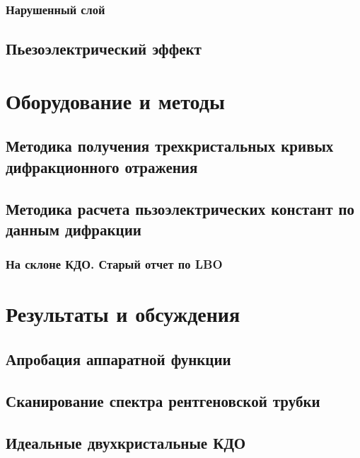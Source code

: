 \documentclass[pdftex,a4paper,14pt,english,russian]{extarticle}
\numberwithin{equation}{subsection}
\begin{document}
    \subsubsection{Нарушенный слой}
      
  \subsection{Пьезоэлектрический эффект}
    

\newpage
\section{Оборудование и методы}
  
  
  

  
  
  \subsection{Методика получения трехкристальных кривых дифракционного отражения}
    
    
  \subsection{Методика расчета пьзоэлектрических констант по данным дифракции}
    
  \subsubsection{На склоне КДО. Старый отчет по LBO}
    


\newpage
\section{Результаты и обсуждения}
  \subsection{Апробация аппаратной функции}
    
  \subsection{Сканирование спектра рентгеновской трубки}
      
  \subsection{Идеальные двухкристальные КДО}
    
    
    
\end{document}
